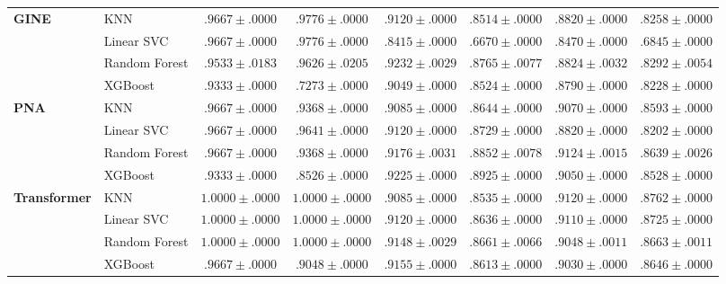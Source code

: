 \begin{landscape}
\begin{table}[htbp]
\begin{tabular}{llcccccc}
\multirow{4}{*}{\textbf{GINE}}
& KNN            & $.9667 \pm .0000$ & $.9776 \pm .0000$ 
                 & $.9120 \pm .0000$ & $.8514 \pm .0000$ 
                 & $.8820 \pm .0000$ & $.8258 \pm .0000$ \\
& Linear SVC     & $.9667 \pm .0000$ & $.9776 \pm .0000$ 
                 & $.8415 \pm .0000$ & $.6670 \pm .0000$ 
                 & $.8470 \pm .0000$ & $.6845 \pm .0000$ \\
& Random Forest  & $.9533 \pm .0183$ & $.9626 \pm .0205$ 
                 & $.9232 \pm .0029$ & $.8765 \pm .0077$ 
                 & $.8824 \pm .0032$ & $.8292 \pm .0054$ \\
& XGBoost        & $.9333 \pm .0000$ & $.7273 \pm .0000$ 
                 & $.9049 \pm .0000$ & $.8524 \pm .0000$ 
                 & $.8790 \pm .0000$ & $.8228 \pm .0000$ \\
\midrule

\multirow{4}{*}{\textbf{PNA}}
& KNN            & $.9667 \pm .0000$ & $.9368 \pm .0000$ 
                 & $.9085 \pm .0000$ & $.8644 \pm .0000$ 
                 & $.9070 \pm .0000$ & $.8593 \pm .0000$ \\
& Linear SVC     & $.9667 \pm .0000$ & $.9641 \pm .0000$ 
                 & $.9120 \pm .0000$ & $.8729 \pm .0000$ 
                 & $.8820 \pm .0000$ & $.8202 \pm .0000$ \\
& Random Forest  & $.9667 \pm .0000$ & $.9368 \pm .0000$ 
                 & $.9176 \pm .0031$ & $.8852 \pm .0078$ 
                 & $.9124 \pm .0015$ & $.8639 \pm .0026$ \\
& XGBoost        & $.9333 \pm .0000$ & $.8526 \pm .0000$ 
                 & $.9225 \pm .0000$ & $.8925 \pm .0000$ 
                 & $.9050 \pm .0000$ & $.8528 \pm .0000$ \\
\midrule

\multirow{4}{*}{\textbf{Transformer}}
& KNN            & $1.0000 \pm .0000$ & $1.0000 \pm .0000$ 
                 & $.9085 \pm .0000$ & $.8535 \pm .0000$ 
                 & $.9120 \pm .0000$ & $.8762 \pm .0000$ \\
& Linear SVC     & $1.0000 \pm .0000$ & $1.0000 \pm .0000$ 
                 & $.9120 \pm .0000$ & $.8636 \pm .0000$ 
                 & $.9110 \pm .0000$ & $.8725 \pm .0000$ \\
& Random Forest  & $1.0000 \pm .0000$ & $1.0000 \pm .0000$ 
                 & $.9148 \pm .0029$ & $.8661 \pm .0066$ 
                 & $.9048 \pm .0011$ & $.8663 \pm .0011$ \\
& XGBoost        & $.9667 \pm .0000$ & $.9048 \pm .0000$ 
                 & $.9155 \pm .0000$ & $.8613 \pm .0000$ 
                 & $.9030 \pm .0000$ & $.8646 \pm .0000$ \\
\bottomrule
\end{tabular}
\end{table}
\end{landscape}


